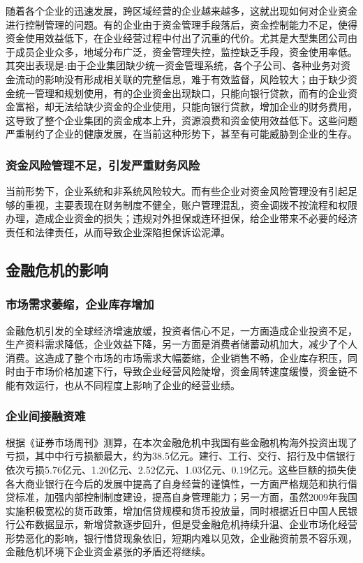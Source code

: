     随着各个企业的迅速发展，跨区域经营的企业越来越多，这就出现如何对企业资金进行控制管理的问题。有的企业由于资金管理手段落后，资金控制能力不足，使得资金使用效益低下，在企业经营过程中付出了沉重的代价。尤其是大型集团公司由于成员企业众多，地域分布广泛，资金管理失控，监控缺乏手段，资金使用率低。其突出表现是:由于企业集团缺少统一资金管理系统，各个子公司、各种业务对资金流动的影响没有形成相关联的完整信息，难于有效监督，风险较大；由于缺少资金统一管理和规划使用，有的企业资金出现缺口，只能向银行贷款，而有的企业资金富裕，却无法给缺少资金的企业使用，只能向银行贷款，增加企业的财务费用，这导致了整个企业集团的资金成本上升，资源浪费和资金使用效益低下。这些问题严重制约了企业的健康发展，在当前这种形势下，甚至有可能威胁到企业的生存。

    \subsubsection {资金风险管理不足，引发严重财务风险}

    当前形势下，企业系统和非系统风险较大。而有些企业对资金风险管理没有引起足够的重视，主要表现在财务制度不健全，账户管理混乱，资金调拨不按流程和权限办理，造成企业资金的损失；违规对外担保或连环担保，给企业带来不必要的经济责任和法律责任，从而导致企业深陷担保诉讼泥潭。

\subsection {金融危机的影响}

    \subsubsection {市场需求萎缩，企业库存增加}

    金融危机引发的全球经济增速放缓，投资者信心不足，一方面造成企业投资不足，生产资料需求降低，企业效益下降，另一方面是消费者储蓄动机加大，减少了个人消费。这造成了整个市场的市场需求大幅萎缩，企业销售不畅，企业库存积压，同时由于市场价格加速下行，导致企业经营风险陡增，资金周转速度缓慢，资金链不能有效运行，也从不同程度上影响了企业的经营业绩。

    \subsubsection {企业间接融资难}

    根据《证券市场周刊》测算，在本次金融危机中我国有些金融机构海外投资出现了亏损，其中中行亏损额最大，约为38.5亿元。建行、工行、交行、招行及中信银行依次亏损5.76亿元、1.20亿元、2.52亿元、1.03亿元、0.19亿元。这些巨额的损失使各大商业银行在今后的发展中提高了自身经营的谨慎性，一方面严格规范和执行借贷标准，加强内部控制制度建设，提高自身管理能力；另一方面，虽然2009年我国实施积极宽松的货币政策，增加信贷规模和货币投放量，同时根据近日中国人民银行公布数据显示，新增贷款逐步回升，但是受金融危机持续升温、企业市场化经营形势恶化的影响，银行惜贷现象依旧，短期内难以见效，企业融资前景不容乐观，金融危机环境下企业资金紧张的矛盾还将继续。

